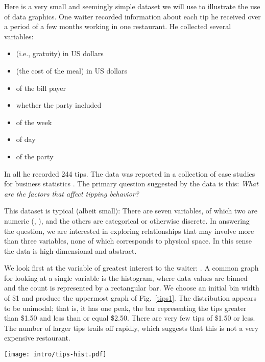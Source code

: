 Here is a very small and seemingly simple dataset we will use to
illustrate the use of data graphics.  One waiter recorded information
about each tip he received over a period of a few months working in
one restaurant.  He collected several variables:
\newpage
\begin{itemize}
\item {} (i.e., gratuity) in US dollars
\item {} (the cost of the meal) in US dollars 
\item {} of the bill payer
\item whether the party included 
\item {} of the week
\item {} of day
\item {} of the party
\end{itemize}
In all he recorded 244 tips.  The data was reported in a collection of
case studies for business statistics \cite{BS95}. The primary
question suggested by the data is this: {\em What are the factors that affect
tipping behavior?}

This dataset is typical (albeit small): There are seven variables,
of which two are numeric (, ), and the others are
categorical or otherwise discrete.  In answering the question, we are
interested in exploring relationships that may involve more than three
variables, none of which corresponds to physical space.  In this sense the
data is high-dimensional and abstract.

We look first at the variable of greatest interest to the waiter:
.  A common graph for looking at a single variable is the
histogram, where data values are binned and the count is represented
by a rectangular bar.  We choose an initial bin width of \$1 and
produce the uppermost graph of Fig.~\ref{tips1}.  The distribution
appears to be unimodal; that is, it has one peak, the bar representing
the tips greater than \$1.50 and less than or equal \$2.50.  There are
very few tips of \$1.50 or less.  The number of larger tips trails
off rapidly, which suggests that this is not a very expensive restaurant.

\begin{figure*}[htp]
\centerline{\texttt{[image: intro/tips-hist.pdf]}}
\caption[Histograms of  with differing bin width]{Histograms
of  with differing bin width: \$1, 10{\it c}.  Bin width
can be changed interactively in interactive systems, often by
dragging a slider.
}
\label{tips1}
\end{figure*}

